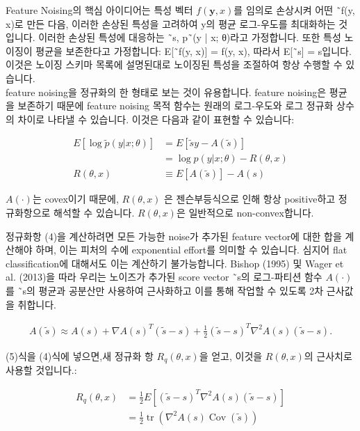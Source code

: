 \documentclass{article}
\begin{document}
Feature Noising의 핵심 아이디어는 특성 벡터 $f(\textbf{y}, x)$를 임의로 손상시켜 어떤 ˜f(y, x)로 만든 다음, 이러한 손상된 특성을 고려하여 y의 평균 로그-우도를 최대화하는 것입니다. 이러한 손상된 특성에 대응하는 ˜s, p˜(y | x; θ)라고 가정합니다. 또한 특성 노이징이 평균을 보존한다고 가정합니다: E[˜f(y, x)] = f(y, x), 따라서 E[˜s] = s입니다. 이것은 노이징 스키마 목록에 설명된대로 노이징된 특성을 조절하여 항상 수행할 수 있습니다.\\

feature noising을 정규화의 한 형태로 보는 것이 유용합니다. feature noising은 평균을 보존하기 때문에 feature noising 목적 함수는 원래의 로그-우도와 로그 정규화 상수의 차이로 나타낼 수 있습니다. 이것은 다음과 같이 표현할 수 있습니다:


\begin{align}
    E[\log \tilde{p}(y | x; \theta)] &= E[\tilde{s}y - A(\tilde{s})] \\
    &= \log p(y | x; \theta) - R(\theta, x) \\
    R(\theta, x) &\equiv E[A(\tilde{s})] - A(s)
\end{align}


$A(\cdot)$는 covex이기 때문에, $R(\theta, x)$ 은 젠슨부등식으로 인해 항상 positive하고 정규화항으로 해석할 수 있습니다. $R(\theta, x)$은 일반적으로 non-convex합니다.

정규화항 (4)을 계산하려면 모든 가능한 noise가 추가된 feature vector에 대한 합을 계산해야 하며, 이는 피처의 수에 exponential effort를 의미할 수 있습니다. 심지어 flat classification에 대해서도 이는 계산하기 불가능합니다. Bishop (1995) 및 Wager et al. (2013)을 따라 우리는 노이즈가 추가된 score vector ˜s의 로그-파티션 함수 $A(\cdot)$를 ˜s의 평균과 공분산만 사용하여 근사화하고 이를 통해 작업할 수 있도록 2차 근사값을 취합니다.

\begin{align}
    A(\tilde{s}) \approx A(s) + \nabla A(s)^T(\tilde{s} - s) + \frac{1}{2}(\tilde{s} - s)^T \nabla^2 A(s)(\tilde{s} - s).
\end{align}

(5)식을 (4)식에 넣으면,새 정규화 항 $R_q(\theta, x)$을 얻고, 이것을 $R(\theta, x)$의 근사치로 사용할 것입니다.:

\begin{align}
R_q(\theta, x) &= \frac{1}{2} E[(\tilde{s} - s)^T \nabla^2 A(s)(\tilde{s} - s)] \\
&= \frac{1}{2} \operatorname{tr}(\nabla^2 A(s) \operatorname{Cov}(\tilde{s}))
\end{align}
\end{document}
